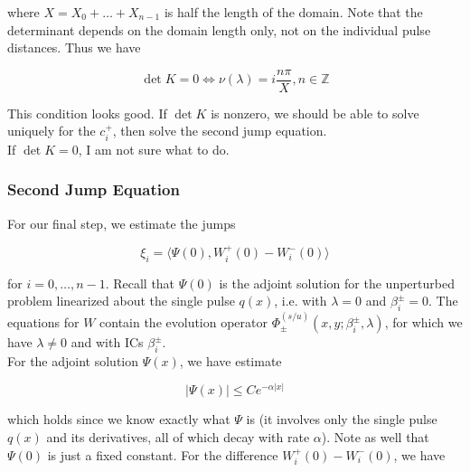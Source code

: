 \documentclass[12pt]{article}
\def\Z{{\mathbb Z}}
\begin{document}
where $X = X_0 + \dots + X_{n-1}$ is half the length of the domain. Note that the determinant depends on the domain length only, not on the individual pulse distances. Thus we have

\[
\det K = 0 \iff \nu(\lambda) = i \frac{n \pi}{X}, n \in \Z
\]

This condition looks good. If $\det K$ is nonzero, we should be able to solve uniquely for the $c_i^+$, then solve the second jump equation.\\

If $\det K = 0$, I am not sure what to do.\\

\subsubsection{Second Jump Equation}

For our final step, we estimate the jumps

\begin{equation}
\xi_i = \langle \Psi(0), W_i^+(0) - W_i^-(0) \rangle 
\end{equation}

for $i = 0, \dots, n-1$. Recall that $\Psi(0)$ is the adjoint solution for the unperturbed problem linearized about the single pulse $q(x)$, i.e. with $\lambda = 0$ and $\beta_i^\pm = 0$. The equations for $W$ contain the evolution operator $\Phi^{(s/u)}_\pm(x, y; \beta_i^\pm, \lambda)$, for which we have $\lambda \neq 0$ and with ICs $\beta_i^\pm$.\\

For the adjoint solution $\Psi(x)$, we have estimate 

\begin{equation}
|\Psi(x)| \leq C e^{-\alpha|x|}
\end{equation}

which holds since we know exactly what $\Psi$ is (it involves only the single pulse $q(x)$ and its derivatives, all of which decay with rate $\alpha$). Note as well that $\Psi(0)$ is just a fixed constant. For the difference $W_i^+(0) - W_i^-(0)$, we have
\end{document}
